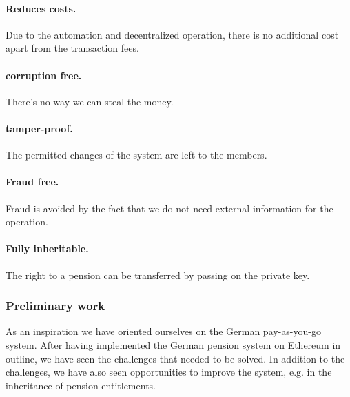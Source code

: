 \paragraph{Reduces costs.} Due to the automation and decentralized operation, there is no additional cost apart from the transaction fees.

\paragraph{corruption free.} There's no way we can steal the money.

\paragraph{tamper-proof.} The permitted changes of the system are left to the members.

\paragraph{Fraud free.}
Fraud is avoided by the fact that we do not need external information for the operation. 

\paragraph{Fully inheritable.}
The right to a pension can be transferred by passing on the private key.


\subsubsection{Preliminary work}

As an inspiration we have oriented ourselves on the German pay-as-you-go system. After having implemented the German pension system on Ethereum in outline, we have seen the challenges that needed to be solved.
In addition to the challenges, we have also seen opportunities to improve the system, e.g. in the inheritance of pension entitlements.
